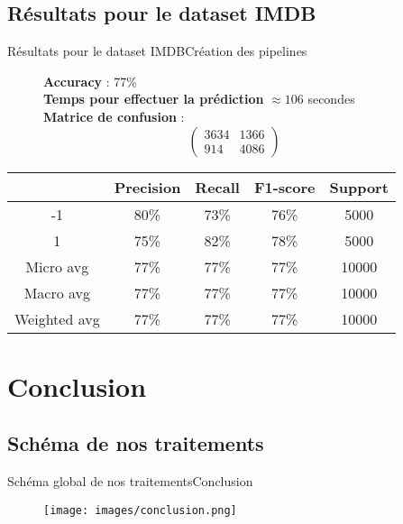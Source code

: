 \documentclass[usenames,dvipsnames]{beamer}
\begin{document}
\subsection{Résultats pour le dataset IMDB}
\begin{frame}{Résultats pour le dataset IMDB}{Création des pipelines}
\begin{figure}[!ht]
  \centering
  \textbf{Accuracy} : 77\% \\
  \textbf{Temps pour effectuer la prédiction} $\approx106$ secondes \\
  \textbf{Matrice de confusion} :
  $$
  \begin{pmatrix}
  3634 & 1366 \\
  914 & 4086
  \end{pmatrix}
  $$
\end{figure}

\begin{table}
  \centering
  \begin{tabular}{|c||c|c|c|c|}
    \hline
     & \textbf{Precision} & \textbf{Recall} & \textbf{F1-score} & \textbf{Support}\\
    \hline
    \hline
    -1 & 80\% & 73\% & 76\% & 5000\\
    \hline
    1 & 75\% & 82\% & 78\% & 5000\\
    \hline
    Micro avg & 77\% & 77\% & 77\% & 10000\\
    \hline
    Macro avg & 77\% & 77\% & 77\% & 10000\\
    \hline
    Weighted avg & 77\% & 77\% & 77\% & 10000\\
    \hline
  \end{tabular}
\end{table}
\end{frame}

\section{Conclusion}
\subsection{Schéma  de nos traitements}
\begin{frame}{Schéma global de nos traitements}{Conclusion}
\begin{figure}
    \centering
    \texttt{[image: images/conclusion.png]}
\end{figure}
\end{frame}
\end{document}
